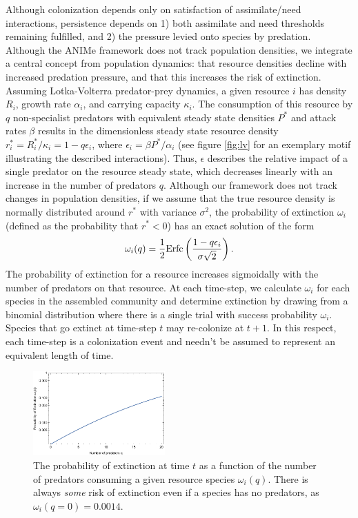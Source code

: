 \documentclass[twocolumn,preprintnumbers,amsmath,amssymb,superscriptaddress]{revtex4}
\begin{document}
Although colonization depends only on satisfaction of assimilate/need interactions, persistence depends on
1) both assimilate and need thresholds remaining fulfilled, and
2) the pressure levied onto species by predation.
Although the ANIMe framework does not track population densities, we integrate a central concept from population dynamics: that resource densities decline with increased predation pressure, and that this increases the risk of extinction.
Assuming Lotka-Volterra predator-prey dynamics, a given resource $i$ has density $R_i$, growth rate $\alpha_i$, and carrying capacity $\kappa_i$.
The consumption of this resource by $q$ non-specialist predators with equivalent steady state densities $P^*$ and attack rates $\beta$ results in the dimensionless steady state resource density $r_i^* = R_i^*/\kappa_i = 1 - q\epsilon_i$, where $\epsilon_i=\beta P^*/\alpha_i$ (see figure \ref{fig:lv} for an exemplary motif illustrating the described interactions).
Thus, $\epsilon$ describes the relative impact of a single predator on the resource steady state, which decreases linearly with an increase in the number of predators $q$.
Although our framework does not track changes in population densities, if we assume that the true resource density is normally distributed around $r^*$ with variance $\sigma^2$, the probability of extinction $\omega_i$ (defined as the probability that $r^* < 0$) has an exact solution of the form
\begin{equation}
  \omega_i(q) = \frac{1}{2}{\rm Erfc}\left(\frac{1-q\epsilon_i}{\sigma\sqrt{2}}\right).
\end{equation}
The probability of extinction for a resource increases sigmoidally with the number of predators on that resource.
At each time-step, we calculate $\omega_i$ for each species in the assembled community and determine extinction by drawing from a binomial distribution where there is a single trial with success probability $\omega_i$.
Species that go extinct at time-step $t$ may re-colonize at $t+1$.
In this respect, each time-step is a colonization event and needn't be assumed to represent an equivalent length of time.

\begin{figure}
\centering
\includegraphics[width=0.45\textwidth]{extinction.pdf}
\caption{
The probability of extinction at time $t$ as a function of the number of predators consuming a given resource species $\omega_i(q)$. There is always \emph{some} risk of extinction even if a species has no predators, as $\omega_i(q=0) = 0.0014$.
}
\label{fig:ext}
\end{figure} 
\end{document}
